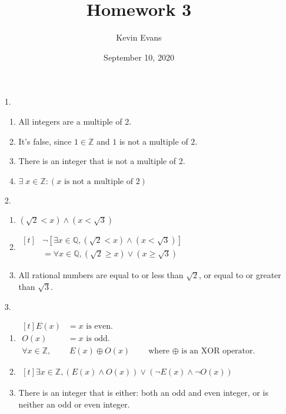 \documentclass{homework}
\title{Homework 3}
\author{Kevin Evans}
\date{September 10, 2020}
\begin{document}
	\maketitle
	\begin{enumerate}
		\item[1.] \begin{enumerate}
			\item All integers are a multiple of 2.
			\item It's false, since $1 \in \mathbb{Z}$ and $1$ is not a multiple of $2$.
			\item There is an integer that is not a multiple of 2.
			\item $\exists \; x \in \mathbb{Z} : (x \text{ is not a multiple of }2)$
		\end{enumerate}
	
		\item[2.] \begin{enumerate}
			\item $\left(\sqrt{2} < x\right) \wedge \left(x < \sqrt{3}\right)$
			\item $\begin{aligned}[t]
				& \neg \left[\exists x \in \mathbb{Q}, \left(\sqrt{2} < x\right) \wedge \left(x < \sqrt{3}\right)\right] \\
				& = \forall x \in \mathbb{Q}, \left(\sqrt{2} \ge x\right) \vee \left( x \ge \sqrt{3}\right)
			\end{aligned}$
			\item All rational numbers are equal to or less than $\sqrt{2}$, or equal to or greater than $\sqrt{3}$.
		\end{enumerate}
	
		\item[3.] \begin{enumerate}
			\item $\begin{aligned}[t]
				E(x) & = x \text{ is even.} \\
				O(x) & = x \text{ is odd.} \\
				\forall x \in \mathbb{Z}, &  \: E(x) \oplus O(x) \qquad \text{where $\oplus$ is an XOR operator.}
			\end{aligned}$
			\item $\begin{aligned}[t]
				\exists x \in \mathbb{Z}, \left( E(x) \wedge O(x) \right) \vee \left(\neg E(x) \wedge \neg O(x)\right)
			\end{aligned}$
			
			\item There is an integer that is either: both an odd and even integer, or is neither an odd or even integer.
		\end{enumerate}
	

\end{enumerate}
\end{document}
